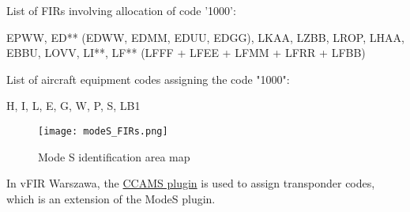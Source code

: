 List of FIRs involving allocation of code '1000':

\-\hspace{1cm}EPWW, ED** (EDWW, EDMM, EDUU, EDGG), LKAA, LZBB, LROP, LHAA, EBBU, LOVV, LI**, LF** (LFFF + LFEE + LFMM + LFRR + LFBB)

List of aircraft equipment codes assigning the code "1000":

\-\hspace{1cm}H, I, L, E, G, W, P, S, LB1

\begin{figure}[htb]
    \centering
    \texttt{[image: modeS\_FIRs.png]}
    \caption{Mode S identification area map}
    \label{fig:modeS}
\end{figure}

In vFIR Warszawa, the \href{https://github.com/kusterjs/CCAMS}{CCAMS plugin} is used to assign transponder codes, which is an extension of the ModeS plugin.